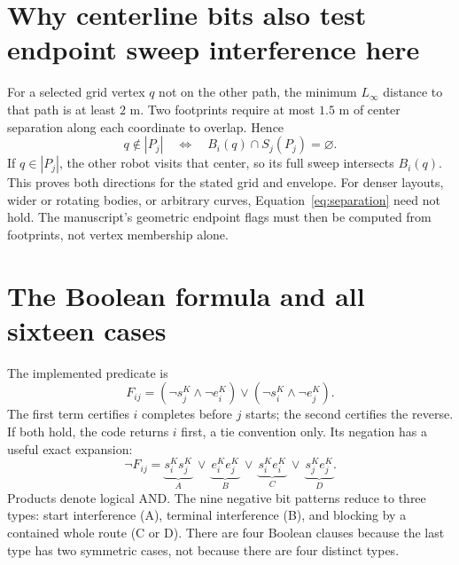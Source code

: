 \documentclass[11pt,a4paper]{article}
\begin{document}
\section{Why centerline bits also test endpoint sweep interference here}
For a selected grid vertex $q$ not on the other path, the minimum $L_\infty$
distance to that path is at least $2$ m. Two footprints require at most $1.5$ m
of center separation along each coordinate to overlap. Hence
\begin{equation}
q\notin|P_j|\quad\Longleftrightarrow\quad
B_i(q)\cap S_j(P_j)=\varnothing.\label{eq:separation}
\end{equation}
If $q\in|P_j|$, the other robot visits that center, so its full sweep intersects
$B_i(q)$. This proves both directions for the stated grid and envelope.
For denser layouts, wider or rotating bodies, or arbitrary curves,
Equation~\eqref{eq:separation} need not hold. The manuscript's geometric endpoint
flags must then be computed from footprints, not vertex membership alone.

\clearpage
\section{The Boolean formula and all sixteen cases}
The implemented predicate is
\begin{equation}
F_{ij}=(\neg s_j^K\land\neg e_i^K)
\lor(\neg s_i^K\land\neg e_j^K).\label{eq:F}
\end{equation}
The first term certifies $i$ completes before $j$ starts; the second certifies
the reverse. If both hold, the code returns $i$ first, a tie convention only.
Its negation has a useful exact expansion:
\begin{equation}
\neg F_{ij}=
\underbrace{s_i^Ks_j^K}_{A}\ \lor\
\underbrace{e_i^Ke_j^K}_{B}\ \lor\
\underbrace{s_i^Ke_i^K}_{C}\ \lor\
\underbrace{s_j^Ke_j^K}_{D}.\label{eq:blocks}
\end{equation}
Products denote logical AND. The nine negative bit patterns reduce to three
types: start interference (A), terminal interference (B), and blocking by a
contained whole route (C or D). There are four Boolean clauses because the
last type has two symmetric cases, not because there are four distinct types.
\end{document}
